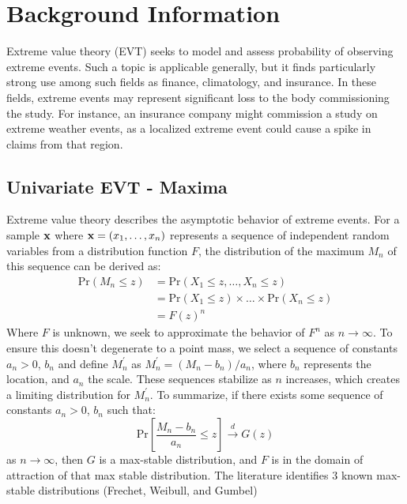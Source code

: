 
\section{Background Information}
Extreme value theory (EVT) seeks to model and assess probability of observing
  extreme events.  Such a topic is applicable generally, but it finds
  particularly strong use among such fields as finance, climatology, and insurance.
  \findcite  In these fields, extreme events may represent significant loss to
  the body commissioning the study.  For instance, an insurance company might
  commission a study on extreme weather events, as a localized extreme event
  could cause a spike in claims from that region.

\subsection{Univariate EVT - Maxima}
Extreme value theory describes the asymptotic behavior of extreme events.  For a
  sample ${\bf x}$ where ${\bf x} = (x_1,\ldots,x_n)$ represents a sequence of
  independent random variables from a distribution function $F$, the
  distribution of the maximum $M_n$ of this sequence can be derived as:
\begin{equation*}
\begin{aligned}
\text{Pr}(M_n\leq z) &= \text{Pr}(X_1 \leq z, \ldots, X_n \leq z)\\
&= \text{Pr}(X_1\leq z)\times\ldots\times\text{Pr}(X_n\leq z)\\
&= F(z)^n
\end{aligned}
\end{equation*}
Where $F$ is unknown, we seek to approximate the behavior of $F^n$ as
  $n\rightarrow\infty$.  To ensure this doesn't degenerate to a point mass, we
  select a sequence of constants $a_n > 0$, $b_n$ and define $M_n^{\prime}$ as
  $M_n^{\prime} = (M_n - b_n)/a_n$, where $b_n$ represents the location, and
  $a_n$ the scale.  These sequences stabilize as $n$ increases, which creates a
  limiting distribution for $M_n^{\prime}$. To summarize, if there exists some
  sequence of constants $a_n > 0$, $b_n$ such that:
\begin{equation*}
\text{Pr}\left[\frac{M_n - b_n}{a_n} \leq z\right] \stackrel{d}{\rightarrow} G(z)
\end{equation*}
as $n\rightarrow\infty$, then $G$ is a max-stable distribution, and $F$ is in
  the domain of attraction of that max stable distribution.  The literature
  identifies 3 known max-stable distributions (Frechet, Weibull, and Gumbel)
